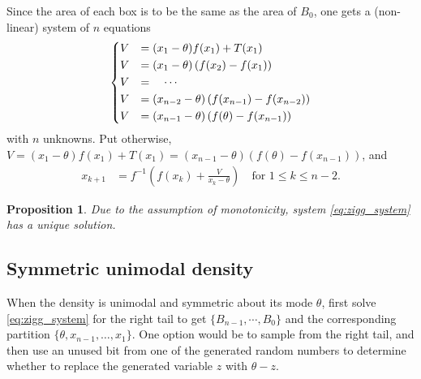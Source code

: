 \documentclass{article}
\newtheorem{proposition}{Proposition}
\theoremstyle{definition} %
\newcommand{\ignore}[1]{}
\newcommand{\Mode}{\theta}
\begin{document}
    Since the area of each box is to be the same as the area of $B_0$, one gets a (non-linear) system of $n$ equations
    \begin{align} \label{eq:zigg_system}
        \begin{dcases}
            V &= (x_1 - \Mode ) f(x_1) + T(x_1) \\
            V &= (x_1 - \Mode ) \left(f(x_2) - f(x_1)\right) \\
            V &= \quad \cdots \\
            V &= (x_{n - 2} - \Mode ) \left(f(x_{n - 1}) - f(x_{n - 2})\right) \\
            V &= (x_{n - 1} - \Mode ) \left(f(\Mode ) - f(x_{n - 1})\right)
        \end{dcases}
    \end{align}
    with $n$ unknowns. Put otherwise, $V = (x_1 - \Mode ) f(x_1) + T(x_1) = (x_{n - 1} - \Mode ) \left(f(\Mode ) - f(x_{n - 1})\right)$, and
    \begin{align*}
        x_{k + 1} &= f^{-1} \left( f(x_k) + \frac{V}{x_k - \Mode } \right) \quad \text{for $1 \le k \le n - 2$}.
    \end{align*}

    \begin{proposition}
        Due to the assumption of monotonicity, system \eqref{eq:zigg_system} has a unique solution.
    \end{proposition}

    \ignore{
    As it is a covering, $V \ge T(\Mode ) / n$ and one can get an upper bound $\overline{x}_1$ for $x_1$:
    \begin{align}
        (\overline{x}_1 - \Mode ) f(\overline{x}_1) + T(\overline{x}_1) = T(\Mode ) / n.
    \end{align}
    If a lower bound is necessary, one could solve the system \eqref{eq:zigg_system} for $n = 2$:
    \begin{align}
        2 (\underline{x}_1 - \Mode ) f(\underline{x}_1) + T(\underline{x}_1) = (\underline{x}_1 - \Mode ) f(\Mode ).
    \end{align}
    } %

\subsection{Symmetric unimodal density}

    When the density is unimodal and symmetric about its mode $\Mode $, first solve \eqref{eq:zigg_system} for the right tail to get $\{ B_{n - 1}, \cdots , B_0 \}$ and the corresponding partition $\{ \Mode , x_{n - 1}, \dots, x_1  \}$.
    One option would be to sample from the right tail, and then use an unused bit from one of the generated random numbers to determine whether to replace the generated variable $z$ with $\Mode - z$.
    
\end{document}
